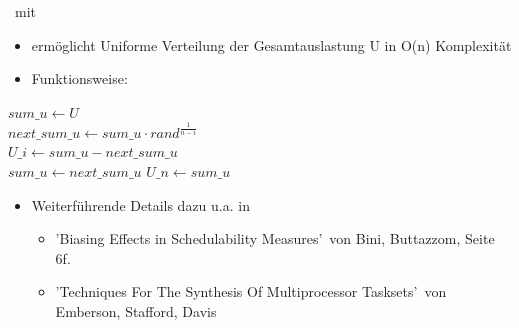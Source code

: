 \documentclass{include/sikslides}
\begin{document}
\begin{frame}[fragile]{\subsecname ~mit \subsubsecname}
	\begin{itemize}
		\item ermöglicht Uniforme Verteilung der Gesamtauslastung U in O(n) Komplexität
		\item Funktionsweise: \\
	\end{itemize}
	\begin{center}
		\begin{minipage}{0.5\linewidth}
			\begin{tcolorbox}
				\begin{algorithm}[H]
					\SetAlgoLined
					\footnotesize
					$sum\_u \gets U$ \\
					 {
						$next\_sum\_u \gets sum\_u \cdot rand^{\frac{1}{n - i}}$ \\
						$U\_i \gets sum\_u - next\_sum\_u $ \\
						$sum\_u \gets next\_sum\_u $
					}
					$U\_n \gets sum\_u$
				\end{algorithm}
			\end{tcolorbox}
		\end{minipage}
	\end{center}
	\BlankLine
	\begin{itemize}
		\item Weiterführende Details dazu u.a. in
		      \begin{itemize}
			      \item 'Biasing Effects in Schedulability Measures'\ von Bini, Buttazzom, Seite 6f.
			      \item 'Techniques For The Synthesis Of Multiprocessor Tasksets'\ von Emberson, Stafford, Davis
		      \end{itemize}
	\end{itemize}
\end{frame}
\source{}
\end{document}
